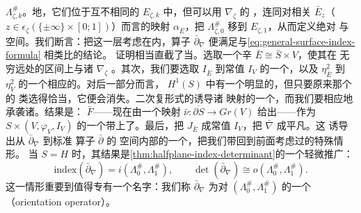 $\Lambda_{\zeta,k}^\#$。\trApriori{}地，它们位于互不相同的\trSymplectic\trVectorSpace
$E_{\zeta,k}$ 中，但可以用\trSymplectic\trConnection{} $\nabla_\zeta$ 的%
\trParallelTransport，连同对相关\trFiber{} $\bar{E}_z$（
$z\in\epsilon_\zeta(\{\pm\infty\}\times[0;1])$）而言的\trSquaredPhase{}映射
$\alpha_{\bar{E}}$，把 $\Lambda_{\zeta,0}^\#$ 移到 $E_{\zeta,1}$，从而定义绝对%
\trIndex{}与\trOrientation{}空间。我们断言：把这一层考虑在内，算子 $\bar\partial_\nabla$
便满足与\eqref{eq:general-surface-index-formula} 相类比的结论。
证明相当直截了当。选取一个辛\trTrivialization{} $\bar{E}\cong\bar{S}\times V$，使其在
无穷远处的区间上与诸\trConnection{} $\nabla_\zeta$ \trCompatible。其次，我们要选取
$I_{\bar{E}}$ 到常值\trComplexStructure{} $I_V$ 的一个\trDeformation，以及
$\eta_{\bar{E}}^2$ 到 $\eta_V^2$ 的一个相应的\trDeformation。对后一部分而言，
$H^1(S)$ 中有一个明显的\trObstruction，但只要原来那个\trTrivialization{}的%
\trHomotopy{}类选得恰当，它便会消失。二次复\trVolume{}形式的\trDeformation{}诱导诸%
\trSquaredPhase{}映射的一个\trHomotopy，而我们要相应地承袭诸\trGrading。结果是：
\trLagrange\trSubbundle{} $\bar{F}$——现在由一个映射
$\bar{\nu}\colon\overline{\partial S}\to Gr(V)$ 给出——作为
$S\times(V,\varphi_V,I_V)$ 的一个\trSubbundle{}带上了\trBraneStructure。最后，把 $J_{\bar{E}}$
\trDeformation{}成常值\trComplexStructure{} $I_V$，把 $\bar{\nabla}$ \trDeformation{}成平凡\trConnection。这
诱导出从 $\bar\partial_\nabla$ 到标准 \trDolbeault{}算子 $\bar\partial$ 的%
\trFredholmOperator{}空间内部的一个\trHomotopy，把我们带回到前面考虑过的特殊情形。
当 $S=H$ 时，其结果是\cref{thm:halfplane-index-determinant}的一个轻微推广：
\begin{equation}\label{eq:orientation-operator-index}
\mathrm{index}(\bar\partial_\nabla)=i(\Lambda_0^\#,\Lambda_1^\#),\qquad
\det(\bar\partial_\nabla)\cong o(\Lambda_0^\#,\Lambda_1^\#).
\end{equation}
这一情形重要到值得专有一个名字：我们称 $\bar\partial_\nabla$ 为\trLinear\trLagrange\trBrane{}对
$(\Lambda_0^\#,\Lambda_1^\#)$ 的一个\textbf{\trOrientationOperator}（orientation
operator）。
